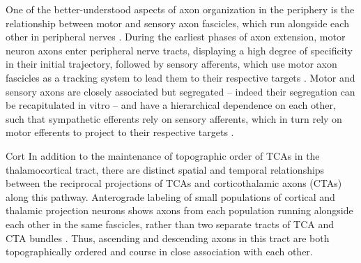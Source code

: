 One of the better-understood aspects of axon organization in the periphery is the relationship between motor and sensory axon fascicles, which run alongside each other in peripheral nerves \cite{honig1998spatial}.
During the earliest phases of axon extension, motor neuron axons enter peripheral nerve tracts, displaying a high degree of specificity in their initial trajectory, followed by sensory afferents, which use motor axon fascicles as a tracking system to lead them to their respective targets \cite{huettl2011npn,landmesser1986altered,wang2013axons,wang2014conserved}.
Motor and sensory axons are closely associated but segregated – indeed their segregation can be recapitulated in vitro \cite{gallarda2008segregation} – and have a hierarchical dependence on each other, such that sympathetic efferents rely on sensory afferents, which in turn rely on motor efferents to project to their respective targets \cite{wang2014conserved}.


Cort
In addition to the maintenance of topographic order of TCAs in the thalamocortical tract, there are distinct spatial and temporal relationships between the reciprocal projections of TCAs and corticothalamic axons (CTAs) along this pathway. 
Anterograde labeling of small populations of cortical and thalamic projection neurons shows axons from each population running alongside each other in the same fascicles, rather than two separate tracts of TCA and CTA bundles \cite{molnar1998mechanisms}. 
Thus, ascending and descending axons in this tract are both topographically ordered and course in close association with each other. 
